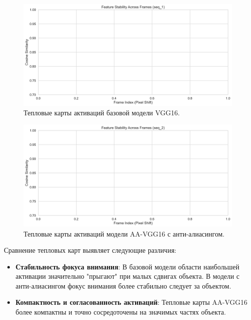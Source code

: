 \begin{figure}[ht]
\centering
\includegraphics[width=\textwidth]{images/classification/cosine_similarity_comparison_seq_1.png}
\caption{Тепловые карты активаций базовой модели VGG16.}
\label{fig:heatmap_vgg16}
\end{figure}

\begin{figure}[ht]
\centering
\includegraphics[width=\textwidth]{images/classification/cosine_similarity_comparison_seq_2.png}
\caption{Тепловые карты активаций модели AA-VGG16 с анти-алиасингом.}
\label{fig:heatmap_aa_vgg16}
\end{figure}

Сравнение тепловых карт выявляет следующие различия:

\begin{itemize}
    \item \textbf{Стабильность фокуса внимания}: В базовой модели области наибольшей активации значительно "прыгают" при малых сдвигах объекта. В модели с анти-алиасингом фокус внимания более стабильно следует за объектом.
    \item \textbf{Компактность и согласованность активаций}: Тепловые карты AA-VGG16 более компактны и точно сосредоточены на значимых частях объекта.
\end{itemize}


